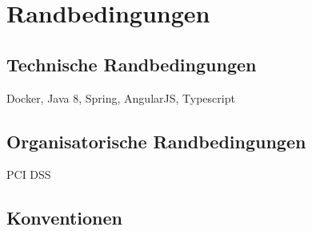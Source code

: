 \chapter{Randbedingungen}

\section{Technische Randbedingungen}

Docker, Java 8, Spring, AngularJS, Typescript

\section{Organisatorische Randbedingungen}

PCI DSS

\section{Konventionen}